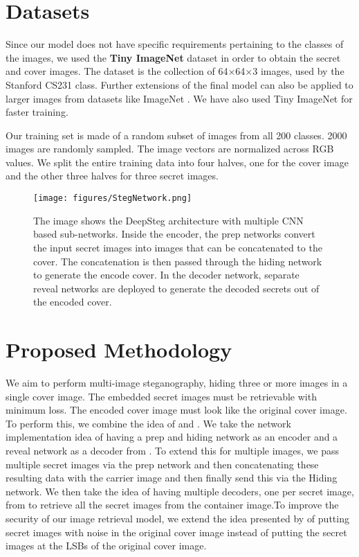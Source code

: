 \documentclass{article}
\begin{document}
\section{Datasets}

    Since our model does not have specific requirements pertaining to the classes of the images, we used the \textbf{Tiny ImageNet} \cite{tiny_imagenet} dataset in order to obtain the secret and cover images. 
    The dataset is the collection of 64$\times$64$\times$3 images, used by the Stanford CS231 class. Further extensions of the final model can also be applied to larger images from datasets like ImageNet \cite{imagenet_cvpr09}. We have also used Tiny ImageNet for faster training. 
    
    Our training set is made of a random subset of images from all 200 classes. 2000 images are randomly sampled. The image vectors are normalized across RGB values. We split the entire training data into four halves, one for the cover image and the other three halves for three secret images.

\begin{figure*}[t]
\vskip 0.2in
\begin{center}
\centerline{\texttt{[image: figures/StegNetwork.png]}}
\caption{The image shows the DeepSteg architecture with multiple CNN based sub-networks. Inside the encoder, the prep networks convert the input secret images into images that can be concatenated to the cover. The concatenation is then passed through the hiding network to generate the encode cover. In the decoder network, separate reveal networks are deployed to generate the decoded secrets out of the encoded cover.}
\label{fig:StegNet}
\end{center}
\vskip -0.2in
\end{figure*}

\section{Proposed Methodology}
We aim to perform multi-image steganography, hiding three or more images in a single cover image. The embedded secret images must be retrievable with minimum loss. The encoded cover image must look like the original cover image. To perform this, we combine the idea of \cite{NIPS2017_6802} and \cite{kreuk2019hide}. We take the network implementation idea of having a prep and hiding network as an encoder and a reveal network as a decoder from \cite{NIPS2017_6802}. To extend this for multiple images, we pass multiple secret images via the prep network and then concatenating these resulting data with the carrier image and then finally send this via the Hiding network. We then take the idea of having multiple decoders, one per secret image, from \cite{kreuk2019hide} to retrieve all the secret images from the container image.To improve the security of our image retrieval model, we extend the idea presented by \cite{NIPS2017_6802} of putting secret images with noise in the original cover image instead of putting the secret images at the LSBs of the original cover image.
\end{document}
